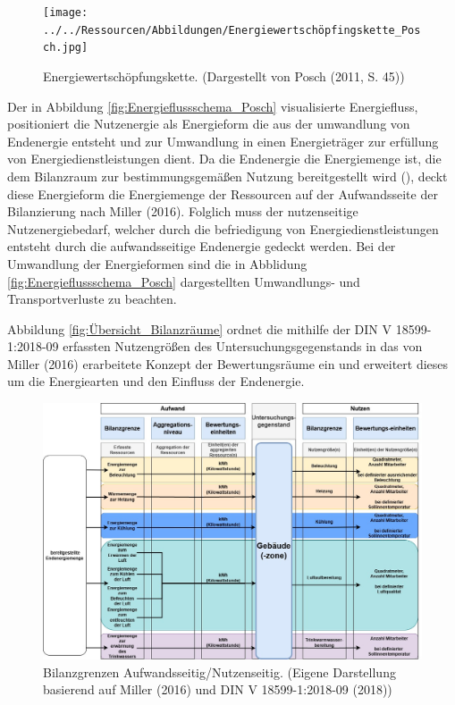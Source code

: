 \begin{figure}[H]
    \centering
    \texttt{[image: ../../Ressourcen/Abbildungen/Energiewertschöpfingskette\_Posch.jpg]}
    \caption{Energiewertschöpfungskette. (Dargestellt von Posch (2011, S. 45))}
    \label{fig:Energieflussschema_Posch}
\end{figure}

Der in Abbildung \eqref{fig:Energieflussschema_Posch} visualisierte Energiefluss, positioniert die Nutzenergie als Energieform die aus der umwandlung von Endenergie entsteht 
und zur Umwandlung in einen Energieträger zur erfüllung von Energiedienstleistungen dient.
Da die Endenergie die Energiemenge ist, die dem Bilanzraum zur bestimmungsgemäßen Nutzung bereitgestellt wird (\cite[Kapitel 3.1.2]{DIN18599.2018}), 
deckt diese Energieform die Energiemenge der Ressourcen auf der Aufwandsseite der Bilanzierung nach Miller (2016).
Folglich muss der nutzenseitige Nutzenergiebedarf, welcher durch die befriedigung von Energiedienstleistungen entsteht durch die aufwandsseitige Endenergie gedeckt werden.
Bei der Umwandlung der Energieformen sind die in Abblidung \eqref{fig:Energieflussschema_Posch} dargestellten Umwandlungs- und Transportverluste zu beachten.


Abbildung \eqref{fig:Übersicht_Bilanzräume} ordnet die mithilfe der DIN V 18599-1:2018-09 erfassten Nutzengrößen des Untersuchungsgegenstands in das von 
Miller (2016) erarbeitete Konzept der Bewertungsräume ein und erweitert dieses um die Energiearten und den Einfluss der Endenergie.

\begin{figure}[H]
    \centering
    \includegraphics[width=1\textwidth]{../../Ressourcen/Abbildungen/Nutzengröße_Bewertungseinheit.jpg}
    \caption{Bilanzgrenzen Aufwandsseitig/Nutzenseitig. (Eigene Darstellung basierend auf Miller (2016) und DIN V 18599-1:2018-09 (2018))}
    \label{fig:Übersicht_Bilanzräume}
\end{figure}

